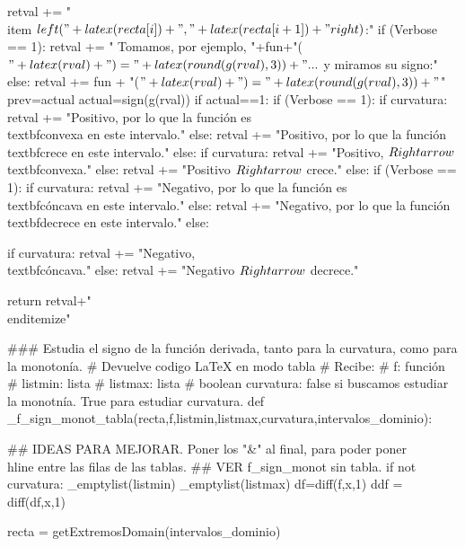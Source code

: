 \begin{sagesilent}
  retval += "\\item $\\left("+latex(recta[i])+","+latex(recta[i+1])+"\\right)$:"
  if (Verbose == 1):
   retval += " Tomamos, por ejemplo, "+fun+"($"+latex(rval)+") = "+latex(round(g(rval),3))+"...$  y miramos su signo:" 
  else:
   retval += fun + "($"+latex(rval)+") = "+latex(round(g(rval),3)) +"$"
  prev=actual
  actual=sign(g(rval))
  if actual==1: 
   if (Verbose == 1):
    if curvatura:
        retval += "Positivo, por lo que la función es \\textbf{convexa} en este intervalo."
    else:
        retval += "Positivo, por lo que la función \\textbf{crece} en este intervalo."  
   else:
    if curvatura:
        retval += "Positivo, $\\Rightarrow$ \\textbf{convexa}."
    else:  
        retval += "Positivo $\\Rightarrow$ crece."
  else:
   if (Verbose == 1):
    if curvatura:
        retval += "Negativo, por lo que la función es \\textbf{cóncava} en este intervalo."
    else:
        retval += "Negativo, por lo que la función \\textbf{decrece} en este intervalo."
   else:

    if curvatura:
        retval += "Negativo, \\textbf{cóncava}."
    else:
        retval += "Negativo $\\Rightarrow$ decrece."


 
 return retval+"\\end{itemize}"
 



### Estudia el signo de la función derivada, tanto para la curvatura, como para la monotonía.
# Devuelve codigo LaTeX en modo tabla
# Recibe:
# f: función
# listmin: lista
# listmax: lista
# boolean curvatura: false si buscamos estudiar la monotnía. True para estudiar curvatura.
def _f_sign_monot_tabla(recta,f,listmin,listmax,curvatura,intervalos_dominio):

## IDEAS PARA MEJORAR. Poner los "&" al final, para poder poner \\hline entre las filas de las tablas.
## VER f_sign_monot sin tabla.
 if not curvatura:
  _emptylist(listmin)
  _emptylist(listmax)
 df=diff(f,x,1)
 ddf = diff(df,x,1)


 recta = getExtremosDomain(intervalos_dominio)
  

\end{sagesilent}
